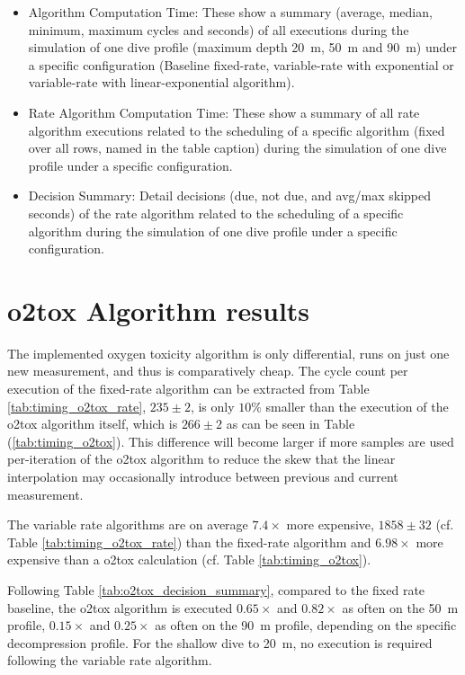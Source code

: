 \begin{itemize}
    \item Algorithm Computation Time: These show a summary (average, median, minimum, maximum cycles and seconds) of all executions during the simulation of one dive profile (maximum depth \SI{20}{\meter}, \SI{50}{\meter} and \SI{90}{\meter}) under a specific configuration (Baseline fixed-rate, variable-rate with exponential or variable-rate with linear-exponential algorithm).
    \item Rate Algorithm Computation Time: These show a summary of all rate algorithm executions related to the scheduling of a specific algorithm (fixed over all rows, named in the table caption) during the simulation of one dive profile under a specific configuration.
    \item Decision Summary: Detail decisions (due, not due, and avg/max skipped seconds) of the rate algorithm related to the scheduling of a specific algorithm during the simulation of one dive profile under a specific configuration.
\end{itemize}

\section{\gls{o2tox} Algorithm results}
The implemented oxygen toxicity algorithm is only differential, runs on just one new measurement, and thus is comparatively cheap. 
The cycle count per execution of the fixed-rate algorithm can be extracted from Table \ref{tab:timing_o2tox_rate}, $235 \pm 2$, is only $10\%$ smaller than the execution of the \gls{o2tox} algorithm itself, which is $266 \pm 2$ as can be seen in Table (\ref{tab:timing_o2tox}).
This difference will become larger if more samples are used per-iteration of the \gls{o2tox} algorithm to reduce the skew that the linear interpolation may occasionally introduce between previous and current measurement.


The variable rate algorithms are on average $7.4\times$ more expensive, $1858 \pm 32$ (cf. Table \ref{tab:timing_o2tox_rate}) than the fixed-rate algorithm and $6.98\times$ more expensive than a \gls{o2tox} calculation (cf. Table \ref{tab:timing_o2tox}).


Following Table \ref{tab:o2tox_decision_summary}, compared to the fixed rate baseline, the \gls{o2tox} algorithm is executed $0.65\times$ and $0.82\times$ as often on the \SI{50}{\meter} profile, $0.15\times$ and $0.25\times$ as often on the \SI{90}{\meter} profile, depending on the specific decompression profile. For the shallow dive to \SI{20}{\meter}, no execution is required following the variable rate algorithm.


